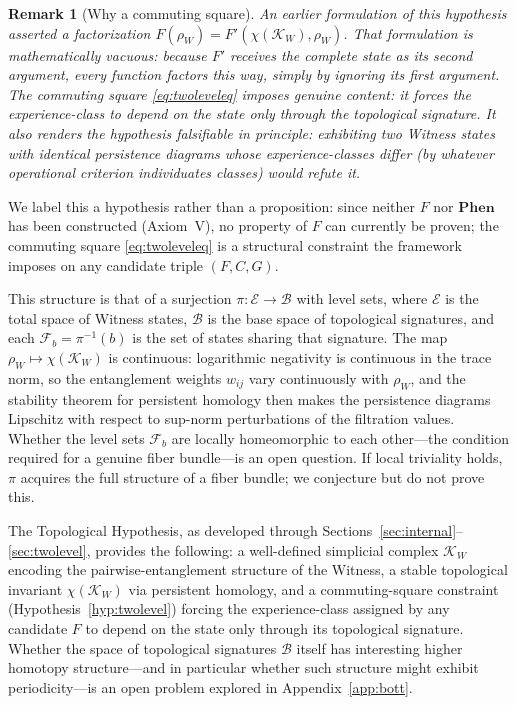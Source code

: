 \documentclass[11pt, a4paper]{article}
\newtheorem{remark}{Remark}
\begin{document}
\begin{remark}[Why a commuting square]
\label{rem:vacuity}
An earlier formulation of this hypothesis asserted a factorization $F(\rho_W) = F'(\chi(\mathcal{K}_W), \rho_W)$. That formulation is mathematically vacuous: because $F'$ receives the complete state as its second argument, \emph{every} function factors this way, simply by ignoring its first argument. The commuting square \eqref{eq:twoleveleq} imposes genuine content: it forces the experience-\emph{class} to depend on the state only through the topological signature. It also renders the hypothesis falsifiable in principle: exhibiting two Witness states with identical persistence diagrams whose experience-classes differ (by whatever operational criterion individuates classes) would refute it.
\end{remark}

We label this a hypothesis rather than a proposition: since neither $F$ nor $\mathbf{Phen}$ has been constructed (Axiom~V), no property of $F$ can currently be proven; the commuting square \eqref{eq:twoleveleq} is a structural constraint the framework imposes on any candidate triple $(F, C, G)$.

This structure is that of a surjection $\pi : \mathcal{E} \to \mathcal{B}$ with level sets, where $\mathcal{E}$ is the total space of Witness states, $\mathcal{B}$ is the base space of topological signatures, and each $\mathcal{F}_b = \pi^{-1}(b)$ is the set of states sharing that signature. The map $\rho_W \mapsto \chi(\mathcal{K}_W)$ is continuous: logarithmic negativity is continuous in the trace norm, so the entanglement weights $w_{ij}$ vary continuously with $\rho_W$, and the stability theorem for persistent homology \cite{CohenSteiner2007} then makes the persistence diagrams Lipschitz with respect to sup-norm perturbations of the filtration values. Whether the level sets $\mathcal{F}_b$ are locally homeomorphic to each other---the condition required for a genuine fiber bundle---is an open question. If local triviality holds, $\pi$ acquires the full structure of a fiber bundle; we conjecture but do not prove this.

\medskip
The Topological Hypothesis, as developed through Sections~\ref{sec:internal}--\ref{sec:twolevel}, provides the following: a well-defined simplicial complex $\mathcal{K}_W$ encoding the pairwise-entanglement structure of the Witness, a stable topological invariant $\chi(\mathcal{K}_W)$ via persistent homology, and a commuting-square constraint (Hypothesis~\ref{hyp:twolevel}) forcing the experience-class assigned by any candidate $F$ to depend on the state only through its topological signature. Whether the space of topological signatures $\mathcal{B}$ itself has interesting higher homotopy structure---and in particular whether such structure might exhibit periodicity---is an open problem explored in Appendix~\ref{app:bott}.
\end{document}

